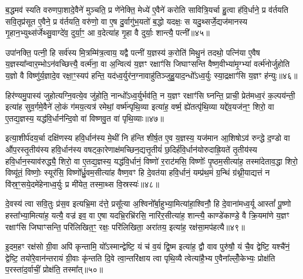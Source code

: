 {\anuvakamend[{वि॒त्त्वा दे॑वय॒त ए॒षाम॑ब्रुव॒न् यानि॒ चतु॑श्चत्वारिꣳशच्च}]}%

ब॒द्धमव॑ स्यति वरुणपा॒शादे॒वैने॑ मुञ्चति॒ प्र णे॑नेक्ति॒ मेध्ये॑ ए॒वैने॑ करोति सावित्रि॒यर्चा हु॒त्वा ह॑वि॒र्धाने॒ प्र व॑र्तयति सवि॒तृप्र॑सूत ए॒वैने॒ प्र व॑र्तयति॒ वरु॑णो॒ वा ए॒ष दु॒र्वागु॑भ॒यतो॑ ब॒द्धो यदक्षः॒ स यदु॒थ्सर्जे॒द्यज॑मानस्य गृ॒हान॒भ्युथ्स॑र्जेथ्सु॒वाग्दे॑व॒ दुर्या॒ꣳ॒ आ व॒देत्या॑ह गृ॒हा वै दुर्याः॒ शान्त्यै॒ पत्नी᳚॥४५॥

उपा॑नक्ति॒ पत्नी॒ हि सर्व॑स्य मि॒त्रम्मि॑त्र॒त्वाय॒ यद्वै पत्नी॑ य॒ज्ञस्य॑ क॒रोति॑ मिथु॒नं तदथो॒ पत्नि॑या ए॒वैष य॒ज्ञस्या᳚न्वार॒म्भो\-ऽन॑वच्छित्त्यै॒ वर्त्म॑ना॒ वा अ॒न्वित्य॑ य॒ज्ञꣳ रक्षाꣳ॑सि जिघाꣳसन्ति वैष्ण॒वीभ्या॑मृ॒ग्भ्यां वर्त्म॑नोर्जुहोति य॒ज्ञो वै विष्णु॑र्य॒ज्ञादे॒व रक्षा॒ꣳ॒स्यप॑ हन्ति॒ यद॑ध्व॒र्युर॑न॒ग्नावाहु॑तिञ्जुहु॒याद॒न्धो᳚\-ऽध्व॒र्युः स्या॒द्रक्षाꣳ॑सि य॒ज्ञꣳ ह॑न्युः॥४६॥

हिर॑ण्यमु॒पास्य॑ जुहोत्यग्नि॒वत्ये॒व जु॑होति॒ नान्धो᳚\-ऽध्व॒र्युर्भव॑ति॒ न य॒ज्ञꣳ रक्षाꣳ॑सि घ्नन्ति॒ प्राची॒ प्रेत॑मध्व॒रं क॒ल्पय॑न्ती॒ इत्या॑ह सुव॒र्गमे॒वैने॑ लो॒कं ग॑मय॒त्यत्र॑ रमेथां॒ वर्ष्म॑न्पृथि॒व्या इत्या॑ह॒ वर्ष्म॒ ह्ये॑तत्पृ॑थि॒व्या यद्दे॑व॒यज॑न॒ꣳ॒ शिरो॒ वा ए॒तद्य॒ज्ञस्य॒ यद्ध॑वि॒र्धान॑न्दि॒वो वा॑ विष्णवु॒त वा॑ पृथि॒व्याः॥४७॥

इत्या॒शीर्प॑दय॒र्चा दक्षि॑णस्य हवि॒र्धान॑स्य मे॒थीं नि ह॑न्ति शीर्\mbox{}ष॒त ए॒व य॒ज्ञस्य॒ यज॑मान आ॒शिषो\-ऽव॑ रुन्द्धे द॒ण्डो वा औ॑प॒रस्तृ॒तीय॑स्य हवि॒र्धान॑स्य वषट्का॒रेणाक्ष॑मच्छिन॒द्यत्तृ॒तीयं॑ छ॒दिर्\mbox{}ह॑वि॒र्धान॑योरुदाह्रि॒यते॑ तृ॒तीय॑स्य हवि॒र्धान॒स्याव॑रुद्ध्यै॒ शिरो॒ वा ए॒तद्य॒ज्ञस्य॒ यद्ध॑वि॒र्धानं॒ विष्णो॑ र॒राट॑मसि॒ विष्णोः᳚ पृ॒ष्ठम॒सीत्या॑ह॒ तस्मा॑देताव॒द्धा शिरो॒ विष्यू॑तं॒ विष्णोः॒ स्यूर॑सि॒ विष्णो᳚र्ध्रु॒वम॒सीत्या॑ह वैष्ण॒वꣳ हि दे॒वत॑या हवि॒र्धानं॒ यम्प्र॑थ॒मं ग्र॒न्थिं ग्र॑थ्नी॒याद्यत्तं न वि॑स्र॒ꣳ॒सये॒दमे॑हेनाध्व॒र्युः प्र मी॑येत॒ तस्मा॒थ्स वि॒स्रस्यः॑॥४८॥

{\anuvakamend[{पत्नी॑ हन्युर्वा पृथि॒व्या विष्यू॑तं॒ विष्णोः॒ षड्विꣳ॑शतिश्च}]}%

दे॒वस्य॑ त्वा सवि॒तुः प्र॑स॒व इत्यभ्रि॒मा द॑त्ते॒ प्रसू᳚त्या अ॒श्विनो᳚र्बा॒हुभ्या॒मित्या॑हा॒श्विनौ॒ हि दे॒वाना॑मध्व॒र्यू आस्तां᳚ पू॒ष्णो हस्ता᳚भ्या॒मित्या॑ह॒ यत्यै॒ वज्र॑ इव॒ वा ए॒षा यदभ्रि॒रभ्रि॑रसि॒ नारि॑र॒सीत्या॑ह॒ शान्त्यै॒ काण्डे॑काण्डे॒ वै क्रि॒यमा॑णे य॒ज्ञꣳ रक्षाꣳ॑सि जिघाꣳसन्ति॒ परि॑लिखित॒ꣳ॒ रक्षः॒ परि॑लिखिता॒ अरा॑तय॒ इत्या॑ह॒ रक्ष॑सा॒मप॑हत्यै॥४९॥

इ॒दम॒हꣳ रक्ष॑सो ग्री॒वा अपि॑ कृन्तामि॒ यो᳚\-ऽस्मान्द्वेष्टि॒ यं च॑ व॒यं द्वि॒ष्म इत्या॑ह॒ द्वौ वाव पुरु॑षौ॒ यं चै॒व द्वेष्टि॒ यश्चै॑नं॒ द्वेष्टि॒ तयो॑रे॒वान॑न्तरायं ग्री॒वाः कृ॑न्तति दि॒वे त्वा॒न्तरि॑क्षाय त्वा पृथि॒व्यै त्वेत्या॑है॒भ्य ए॒वैना᳚ल्लोँ॒केभ्यः॒ प्रोक्ष॑ति प॒रस्ता॑द॒र्वाचीं॒ प्रोक्ष॑ति॒ तस्मा᳚त्॥५०॥

